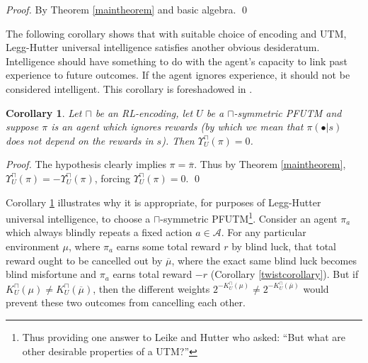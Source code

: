 \documentclass[runningheads]{llncs}
\newtheorem{mycorollary}[mytheorem]{Corollary}
\def\LH{\Upsilon}
\begin{document}
\begin{proof}
    By Theorem \ref{maintheorem} and basic algebra.
    \qed
\end{proof}

The following corollary shows that with suitable choice of encoding and UTM,
Legg-Hutter universal intelligence satisfies another obvious desideratum.
Intelligence should have something to do with the agent's capacity to link
past experience to future outcomes. If the agent ignores experience, it should
not be considered intelligent. This corollary is foreshadowed
in \cite{legg2013approximation}.

\begin{mycorollary}
\label{ignoringrewardscorollary}
    Let $\sqcap$ be an RL-encoding,
    let $U$ be a $\sqcap$-symmetric PFUTM and
    suppose $\pi$ is an agent which ignores rewards (by which we mean that
    $\pi(\bullet|s)$ does not depend on the rewards in $s$).
    Then $\LH^\sqcap_U(\pi)=0$.
\end{mycorollary}

\begin{proof}
    The hypothesis clearly implies $\pi=\overline\pi$. Thus by Theorem
    \ref{maintheorem}, $\LH^\sqcap_U(\pi)=-\LH^\sqcap_U(\pi)$,
    forcing $\LH^\sqcap_U(\pi)=0$.
    \qed
\end{proof}

Corollary \ref{ignoringrewardscorollary} illustrates why it is appropriate, for
purposes of Legg-Hutter universal intelligence, to choose a $\sqcap$-symmetric
PFUTM\footnote{Thus providing one answer to Leike and Hutter
\cite{leike2015bad} who asked: ``But what are other desirable properties of a UTM?''}.
Consider an agent $\pi_a$
which always blindly repeats a fixed action $a\in\mathcal A$.
For any particular environment $\mu$,
where $\pi_a$ earns some total reward $r$ by blind luck,
that total reward ought to be cancelled out by $\overline\mu$, where
the exact same blind luck becomes blind misfortune and $\pi_a$ earns total reward
$-r$ (Corollary \ref{twistcorollary}). But if $K^\sqcap_U(\mu)\not=K^\sqcap_U(\overline\mu)$,
then the different weights
$2^{-K^\sqcap_U(\mu)}\not=2^{-K^\sqcap_U(\overline\mu)}$ would prevent
these two outcomes from cancelling each other.
\end{document}
